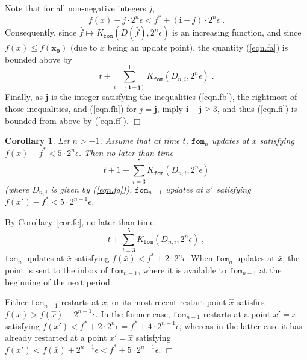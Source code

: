 \documentclass[reqno, 11pt]{amsart}
\newtheorem{cor}[prop]{Corollary}
\numberwithin{equation}{section}
\newcommand{\fom}{\mathtt{fom}}
\begin{document}
Note that for all non-negative integers $ j $, 
 \begin{equation}  \label{eqn.fh} 
     f(x) - j \cdot 2^n \epsilon < f^* + (\mathbf{i} - j) \cdot 2^n \epsilon \; . 
     \end{equation}
Consequently, since $ \hat{f} \mapsto K_{\fom}( D( \hat{f}), 2^n \epsilon ) $ is an increasing function, and since $ f(x) \leq f( \mathbf{x_0}) $ (due to $ x $ being an update point),   the quantity (\ref{eqn.fa})  is bounded above by
\begin{equation}  \label{eqn.fi} 
   t + \sum_{i = (\mathbf{i} - \mathbf{j})}^{\mathbf{i}} K_{\fom}(D_{n,i}, 2^n \epsilon) \; . 
\end{equation}
Finally, as $ \mathbf{j} $ is the integer satisfying the inequalities (\ref{eqn.fb}), the rightmost of those inequalities, and (\ref{eqn.fh})  for $ j = \mathbf{j} $, imply $ \mathbf{i} - \mathbf{j} \geq 3 $, and thus (\ref{eqn.fi}) is bounded from above by (\ref{eqn.ff}). \hfill $ \Box $


\begin{cor}  \label{cor.fd} 
Let $  n > -1 $. Assume that at time $ t $, $ \fom_{n} $ updates at $ x $ satisfying $ f(x) - f^* < 5 \cdot 2^n \epsilon $. Then no later than time
\[ 
     t + 1  + \sum_{i=3}^5 K_{\fom}( D_{n,i}, 2^n \epsilon ) 
\] 
(where $ D_{n,i} $ is given by (\ref{eqn.fg})), $ \fom_{n-1} $ updates at $ x' $ satisfying $ f( x')  - f^* < 5 \cdot 2^{n-1} \epsilon $.
\end{cor}
  By Corollary~\ref{cor.fc}, no later than time 
\[ t +  \sum_{i=3}^5 K_{\fom}( D_{n,i}, 2^n \epsilon )  \; , \]
  $ \fom_n $ updates at $ \bar{x} $ satisfying $ f(\bar{x}) < f^* + 2 \cdot 2^n \epsilon $. When $ \fom_n $ updates at $ \bar{x} $, the point is sent to the inbox of $ \fom_{n-1} $, where it is available to $ \fom_{n-1} $ at the beginning of the next period.

Either $ \fom_{n-1} $ restarts at $ \bar{x} $, or its most recent restart point $ \hat{x}  $ satisfies $ f( \bar{x}  ) > f( \hat{x} ) - 2^{n-1} \epsilon $. In the former case, $ \fom_{n-1} $ restarts at a point $ x' = \bar{x} $    satisfying $  f(x') < f^* + 2 \cdot 2^n \epsilon = f^* + 4 \cdot 2^{n-1} \epsilon $, whereas in the latter case it has already restarted at a point $ x' = \hat{x}  $ satisfying $ f(x') < f( \bar{x}) + 2^{n-1} \epsilon < f^* + 5 \cdot 2^{n-1} \epsilon $. \hfill $ \Box $    
\end{document}

